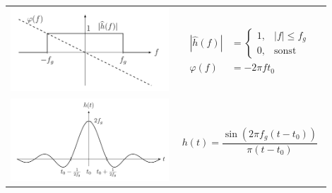 \begin{tabular}[c]{@{}p{0.5\linewidth}p{0.4\linewidth}@{}}
    \begin{minipage}[top]{\linewidth}
        \includegraphics*[width=\linewidth]{../img/7_TP_f.png}
    \end{minipage}
     &
    \begin{minipage}[top]{\linewidth}
        {
            \begin{align*}
                |\hat{h}(f)| & =
                \begin{cases}
                    1, & |f|\leq f_g  \\
                    0, & \text{sonst}
                \end{cases}           \\
                \varphi(f)   & = -2\pi ft_0
            \end{align*}
        }
    \end{minipage}
    \\
    \begin{minipage}[top]{\linewidth}
        \includegraphics*[width=\linewidth]{../img/7_TP_t.png}
    \end{minipage}
     &
    \begin{minipage}[top]{\linewidth}
        \begin{equation*}
            h(t) = \frac{\sin(2\pi f_g(t-t_0))}{\pi (t-t_0)}
        \end{equation*}
    \end{minipage}
\end{tabular}

